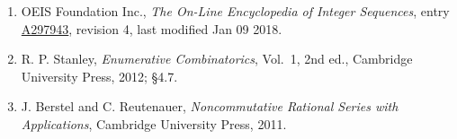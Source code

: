\documentclass[11pt]{article}
\theoremstyle{definition}
\begin{document}
\begin{enumerate}

\item OEIS Foundation Inc., \emph{The On-Line Encyclopedia of Integer Sequences}, entry \href{https://oeis.org/A297943}{A297943}, revision 4, last modified Jan 09 2018.

\item R. P. Stanley, \emph{Enumerative Combinatorics}, Vol.~1, 2nd ed., Cambridge University Press, 2012; \S4.7.

\item J. Berstel and C. Reutenauer, \emph{Noncommutative Rational Series with Applications}, Cambridge University Press, 2011.

\end{enumerate}
\end{document}
